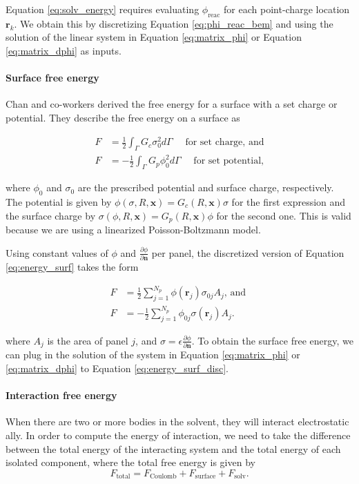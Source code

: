 Equation \eqref{eq:solv_energy} requires evaluating $\phi_{\text{reac}}$ for each point-charge location $\mathbf{r}_k$. We obtain this by discretizing Equation \eqref{eq:phi_reac_bem} and using the solution of the linear system in Equation \eqref{eq:matrix_phi} or Equation \eqref{eq:matrix_dphi} as inputs.

\medskip
\paragraph*{Surface free energy}

Chan and co-workers \cite{ChanMitchell1983,CarnieChan1993} derived the free energy for a surface with a set charge or potential. They describe the free energy on a surface as

\begin{align} \label{eq:energy_surf}
F &= \frac{1}{2} \int_{\Gamma} G_c \sigma_0^2 d\Gamma \quad \text{ for set charge, and} \nonumber \\
F &= -\frac{1}{2} \int_{\Gamma} G_p \phi_0^2 d\Gamma \quad \text{ for set potential,}
\end{align} 

\noindent where $\phi_0$ and $\sigma_0$ are the prescribed potential and surface charge, respectively. The potential is given by $\phi(\sigma, R, \mathbf{x}) = G_c(R, \mathbf{x}) \sigma$ for the first expression and the surface charge by $\sigma(\phi, R, \mathbf{x}) = G_p(R, \mathbf{x}) \phi$ for the second one. This is valid because we are using a linearized Poisson-Boltzmann model.

Using constant values of $\phi$ and $\frac{\partial \phi}{\partial \mathbf{n}}$ per panel, the discretized version of Equation \eqref{eq:energy_surf} takes the form

\begin{align} \label{eq:energy_surf_disc}
F &= \frac{1}{2} \sum_{j=1}^{N_p} \phi(\mathbf{r}_j) \sigma_{0j} A_j \text{, and } \nonumber \\
F &= -\frac{1}{2} \sum_{j=1}^{N_p} \phi_{0j} \sigma(\mathbf{r}_j) A_j. 
\end{align}

\noindent where $A_j$ is the area of panel $j$, and $\sigma = \epsilon \frac{\partial \phi}{\partial \mathbf{n}}$. To obtain the surface free energy, we can plug in the solution of the system in Equation \eqref{eq:matrix_phi} or \eqref{eq:matrix_dphi} to Equation \eqref{eq:energy_surf_disc}. 

\medskip
\paragraph*{Interaction free energy}
When there are two or more bodies in the solvent, they will interact electrostatic ally. In order to compute the energy of interaction, we need to take the difference between the total energy of the interacting system and the total energy of each isolated component, where the total free energy is given by
%
\begin{equation} \label{eq:total_energy}
F_{\text{total}} = F_{\text{Coulomb}} + F_{\text{surface}} + F_{\text{solv}}.
\end{equation}

